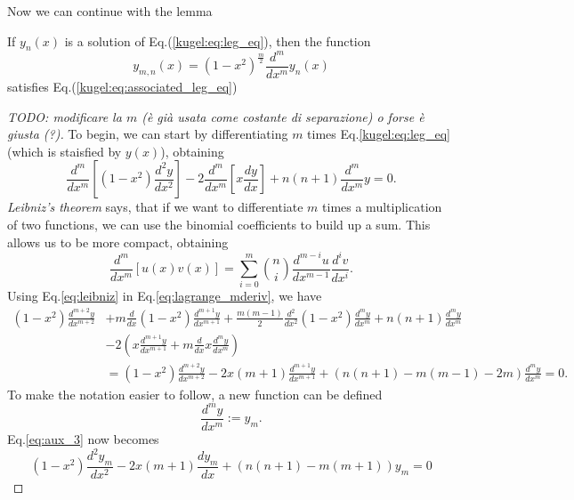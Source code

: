 Now we can continue with the lemma
\begin{lemma}\label{kugel:lemma_1}
    If $y_n(x)$ is a solution of Eq.(\ref{kugel:eq:leg_eq}), then the function
    \begin{equation*}
        y_{m,n}(x) = (1-x^2)^{\frac{m}{2}}\frac{d^m}{dx^m}y_n(x)
    \end{equation*}
    satisfies Eq.(\ref{kugel:eq:associated_leg_eq})
\end{lemma}
\begin{proof} [TODO: modificare la $m$ (è già usata come costante di separazione) o forse è giusta (?)]
    To begin, we can start by differentiating $m$ times Eq.\eqref{kugel:eq:leg_eq} (which is staisfied by $y(x)$), obtaining
    \begin{equation}\label{eq:lagrange_mderiv}
    \frac{d^m}{dx^m}\left[ (1-x^2)\frac{d^2y}{dx^2} \right] -2 \frac{d^m}{dx^m}\left[ x\frac{dy}{dx} \right] + n(n+1)\frac{d^m}{dx^m}y=0.
    \end{equation}
    \emph{Leibniz's theorem} says, that if we want to differentiate $m$ times a multiplication of two functions, we can use the binomial coefficients to build up a sum. This allows us to be more compact, obtaining 
    \begin{equation}\label{eq:leibniz}
    \frac{d^m}{dx^m}[u(x)v(x)] = \sum_{i=0}^m \binom{n}{i} \frac{d^{m-i}u}{dx^{m-1}} \frac{d^{i}v}{dx^i}.
    \end{equation}
    Using Eq.\eqref{eq:leibniz} in Eq.\eqref{eq:lagrange_mderiv}, we have
    \begin{align}
    (1-x^2)\frac{d^{m+2}y}{dx^{m+2}} &+ m \frac{d}{dx}(1-x^2)\frac{d^{m+1}y}{dx^{m+1}} + \frac{m(m-1)}{2}\frac{d^{2}}{dx^{2}}(1-x^2)\frac{d^{m}y}{dx^{m}} + n(n+1)\frac{d^m{}y}{dx^{m}} \nonumber \\
    &-2\left(x\frac{d^{m+1}y}{dx^{m+1}} + m\frac{d}{dx}x\frac{d^{m}y}{dx^{m}} \right) \nonumber \\
    &= (1-x^2)\frac{d^{m+2}y}{dx^{m+2}} -2x(m+1)\frac{d^{m+1}y}{dx^{m+1}}+(n(n+1)-m(m-1)-2m)\frac{d^{m}y}{dx^{m}}=0. \label{eq:aux_3}
    \end{align}
    To make the notation easier to follow, a new function can be defined
    \begin{equation*}
    \frac{d^{m}y}{dx^{m}} := y_m.
    \end{equation*}
    Eq.\eqref{eq:aux_3} now becomes
    \begin{equation}\label{eq:1st_subs}
    (1-x^2)\frac{d^{2}y_m}{dx^{2}} -2x(m+1)\frac{dy_m}{dx}+(n(n+1)-m(m+1))y_m=0

\end{equation}
\end{proof}
